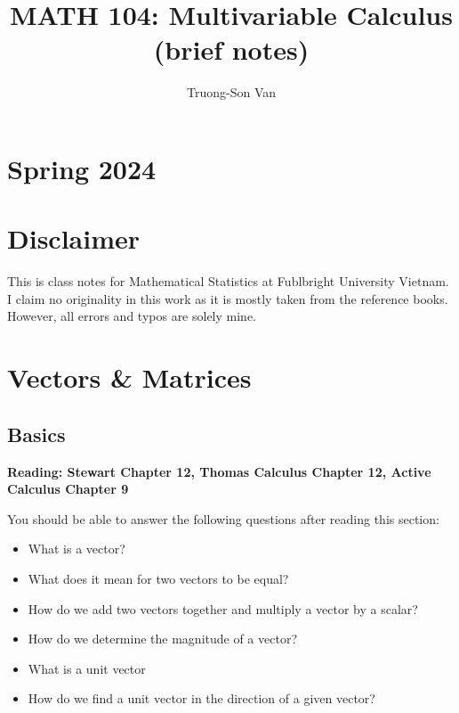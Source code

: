 \documentclass[
]{book}
\title{MATH 104: Multivariable Calculus (brief notes)}
\author{Truong-Son Van}
\date{}
\theoremstyle{definition}
\theoremstyle{definition}
\theoremstyle{definition}
\theoremstyle{definition}
\theoremstyle{remark}
\begin{document}
\maketitle

{
\setcounter{tocdepth}{2}
\tableofcontents
}
\chapter*{Spring 2024}\label{spring-2024}

\chapter*{Disclaimer}\label{disclaimer}


This is class notes for Mathematical Statistics at Fublbright University Vietnam.
I claim no originality in this work as it is mostly taken from the reference books.
However, all errors and typos are solely mine.

\newpage

\newcommand{\vectorproj}[2][]{\mathrm{proj}_{\vect{#1}}\vect{#2}}
\newcommand{\vectorcomp}[2][]{\mathrm{comp}_{\vect{#1}}\vect{#2}}
\newcommand{\vect}{\mathbf}
\newcommand{\R}{\mathbb{R}}

\chapter{Vectors \& Matrices}\label{vectors-matrices}

\section{Basics}\label{basics}

\textbf{Reading: Stewart Chapter 12, Thomas Calculus Chapter 12,
Active Calculus Chapter 9}

You should be able to answer the following questions after reading this section:

\begin{itemize}
\item
  What is a vector?
\item
  What does it mean for two vectors to be equal?
\item
  How do we add two vectors together and multiply a vector by a scalar?
\item
  How do we determine the magnitude of a vector?
\item
  What is a unit vector
\item
  How do we find a unit vector in the direction of a given vector?
\end{itemize}
\end{document}
